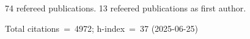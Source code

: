 74 refereed publications. 13 refeered publications as first author.

Total citations~=~4972; h-index~=~37 (2025-06-25)